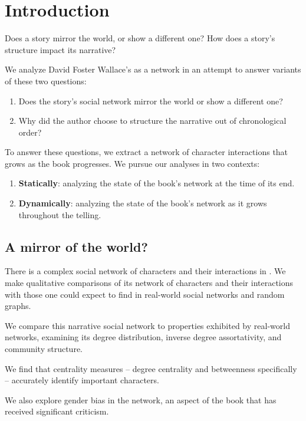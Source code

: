\section{Introduction}

Does a story mirror the world, or show a different one? How does a story's structure impact its narrative?

We analyze David Foster Wallace's \infinitejest as a network in an attempt to answer variants of these two questions:

\begin{enumerate}
    \item Does the story's social network mirror the world or show a different one?
    \item Why did the author choose to structure the narrative out of chronological order?
\end{enumerate}

To answer these questions, we extract a network of character interactions that grows as the book progresses. We pursue our analyses in two contexts:

\begin{enumerate}
    \item \textbf{Statically}: analyzing the state of the book's network at the time of its end. 
    \item \textbf{Dynamically}: analyzing the state of the book's network as it grows throughout the telling.
\end{enumerate}

\subsection{A mirror of the world?}

There is a complex social network of characters and their interactions in \infinitejest. We make qualitative comparisons of its network of characters and their interactions with those one could expect to find in real-world social networks and random graphs. 

We compare this narrative social network to properties exhibited by real-world networks, examining its degree distribution, inverse degree assortativity, and community structure.

We find that centrality measures -- degree centrality and betweenness specifically -- accurately identify important characters. 

We also explore gender bias in the network, an aspect of the book that has received significant criticism.

